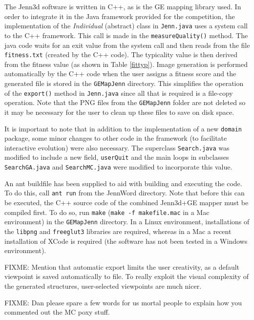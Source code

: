 \documentclass{article}
\begin{document}
The Jenn3d software is written in C++, as is the GE mapping library used. In
order to integrate it in the Java framework provided for the competition, the
implementation of the \textit{Individual} (abstract) class in \texttt{Jenn.java} uses 
a system call to the C++ framework. This call is made in the \texttt{measureQuality()} 
method. The java code waits for an exit value from the system call and then reads 
from the file \texttt{fitness.txt} (created by the C++ code). The typicality value is then 
derived from the fitness value (as shown in Table \ref{fittyp}). Image generation is 
performed automatically by the C++ code when the user assigns a fitness score and the generated
file is stored in the \texttt{GEMapJenn} directory. This simplifies the operation of the
\texttt{export()} method in \texttt{Jenn.java} since all that is required is a file-copy
operation. Note that the PNG files from the \texttt{GEMapJenn} folder are not deleted so 
it may be necessary for the user to clean up these files to save on disk space.

It is important to note that in addition to the implementation of a new \texttt{domain} 
package, some minor changes to other code in the framework (to facilitate interactive evolution)
were also necessary. The superclass \texttt{Search.java} was modified to include a new field, 
\texttt{userQuit} and the main loops in subclasses \texttt{SearchGA.java} and \texttt{SearchMC.java} 
were modified to incorporate this value.

An ant buildfile has been supplied to aid with building and executing the code. To do this, call 
\texttt{ant run} from the JennWord directory. Note that before this can be executed, the 
C++ source code of the combined Jenn3d+GE mapper must be compiled first. To do
so, run \texttt{make} (\texttt{make -f makefile.mac} in a Mac environment) in
the \texttt{GEMapJenn} directory. In a Linux environment, installations of
the \texttt{libpng} and \texttt{freeglut3} libraries are required, whereas in a Mac 
a recent installation of XCode is required (the software has not been tested in a 
Windows environment).

FIXME: Mention that automatic export limits the user creativity, as a default
viewpoint is saved automatically to file. To really exploit the visual
complexity of the generated structures, user-selected viewpoints are much
nicer.

FIXME: Dan please spare a few words for us mortal people to explain how you
commented out the MC poxy stuff.
\end{document}
